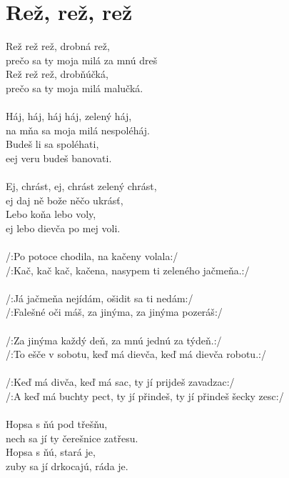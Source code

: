 \section{Rež, rež, rež}
Rež rež rež, drobná rež,\\
prečo sa ty moja milá za mnú dreš\\
Rež rež rež, drobňúčká,\\
prečo sa ty moja milá malučká.\\
\\
Háj, háj, háj háj, zelený háj,\\
na mňa sa moja milá nespoléháj.\\
Budeš li sa spoléhati,\\
eej veru budeš banovati.\\
\\
Ej, chrást, ej, chrást zelený chrást,\\
ej daj ně bože něčo ukrásť,\\
Lebo koňa lebo voly,\\
ej lebo dievča po mej voli.\\
\\
/:Po potoce chodila, na kačeny volala:/\\
/:Kač, kač kač, kačena, nasypem ti zeleného jačmeňa.:/\\
\\
/:Já jačmeňa nejídám, ošidit sa ti nedám:/\\
/:Falešné oči máš, za jinýma, za jinýma pozeráš:/\\
\\
/:Za jinýma každý deň, za mnú jednú za týdeň.:/\\
/:To ešče v sobotu, keď má dievča, keď má dievča robotu.:/\\
\\
/:Keď má divča, keď má sac, ty jí prijdeš zavadzac:/\\
/:A keď má buchty pect, ty jí přindeš, ty jí přindeš šecky zesc:/\\
\\
Hopsa s ňú pod třešňu,\\
nech sa jí ty čerešnice zatřesu.\\
Hopsa s ňú, stará je,\\
zuby sa jí drkocajú, ráda je.\\
